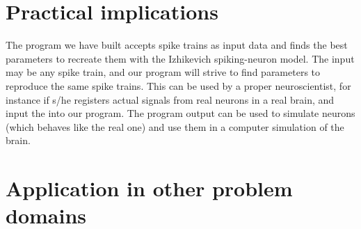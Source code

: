 \documentclass[10pt]{article}
\begin{document}
\section{Practical implications}\label{sec:implications}
The program we have built accepts spike trains as input data and finds the best parameters to recreate them with the Izhikevich spiking-neuron model. The input may be any spike train, and our program will strive to find parameters to reproduce the same spike trains. This can be used by a proper neuroscientist, for instance if s/he registers actual signals from real neurons in a real brain, and input the into our program. The program output can be used to simulate neurons (which behaves like the real one) and use them in a computer simulation of the brain.
\section{Application in other problem domains}\label{sec:applications}
\end{document}
